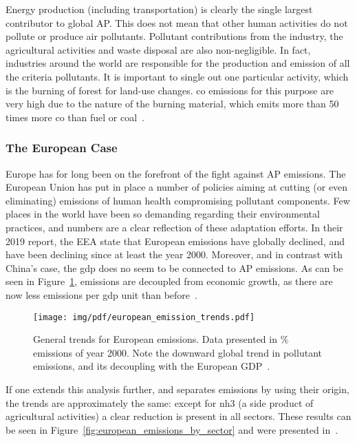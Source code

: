 Energy production (including transportation) is clearly the single
largest contributor to global \gls{AP}. This does not mean that other
human activities do not pollute or produce air pollutants. Pollutant
contributions from the industry, the agricultural activities and waste
disposal are also non-negligible. In fact, industries around the world
are responsible for the production and emission of all the criteria
pollutants. It is important to single out one particular activity, which
is the burning of forest for land-use changes. \gls{co} emissions for
this purpose are very high due to the nature of the burning material,
which emits more than 50 times more \gls{co} than fuel or
coal~\cite{CABI2019}.

\subsubsection{The European Case}%
\label{ssub:the_european_case}

Europe has for long been on the forefront of the fight against \gls{AP}
emissions. The European Union has put in place a number of policies
aiming at cutting (or even eliminating) emissions of human health
compromising pollutant components. Few places in the world have been so
demanding regarding their environmental practices, and numbers are a
clear reflection of these adaptation efforts. In their 2019 report, the
\gls{EEA} state that European emissions have globally declined, and have
been declining since at least the year 2000. Moreover, and in contrast
with China's case, the \gls{gdp} does no seem to be connected to
\gls{AP} emissions. As can be seen in
Figure~\ref{fig:european_emission_trends}, emissions are decoupled from
economic growth, as there are now less emissions per \gls{gdp} unit than
before~\cite{EEA2019}.

\begin{figure}[htpb]
    \centering
    \texttt{[image: img/pdf/european\_emission\_trends.pdf]}
    \caption{General trends for European emissions. Data presented in \%
    emissions of year 2000. Note the downward global trend in pollutant
    emissions, and its decoupling with the European GDP~\cite{EEA2019}.}
    \label{fig:european_emission_trends}
\end{figure}

If one extends this analysis further, and separates emissions by using
their origin, the trends are approximately the same: except for
\gls{nh3} (a side product of agricultural activities) a clear reduction
is present in all sectors. These results can be seen in
Figure~\ref{fig:european_emissions_by_sector} and were presented
in~\cite{EEA2019}.

